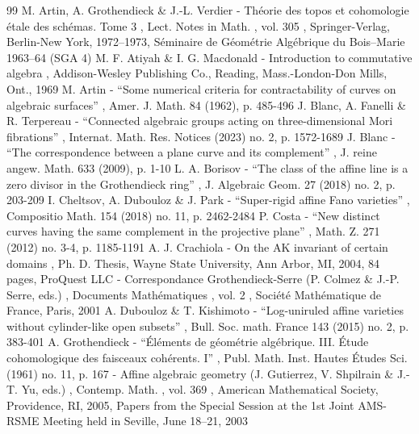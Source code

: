 \documentclass[11pt]{article}
\theoremstyle{definition}
\begin{document}

\begin{thebibliography}{99}
 M. Artin, A. Grothendieck \& J.-L. Verdier - Théorie des topos et cohomologie étale des schémas. Tome 3 , Lect. Notes in Math. , vol. 305 , Springer-Verlag, Berlin-New York, 1972–1973, Séminaire de Géométrie Algébrique du Bois–Marie 1963–64 (SGA 4)
 M. F. Atiyah \& I. G. Macdonald - Introduction to commutative algebra , Addison-Wesley Publishing Co., Reading, Mass.-London-Don Mills, Ont., 1969
 M. Artin - “Some numerical criteria for contractability of curves on algebraic surfaces” , Amer. J. Math. 84 (1962), p. 485-496
 J. Blanc, A. Fanelli \& R. Terpereau - “Connected algebraic groups acting on three-dimensional Mori fibrations” , Internat. Math. Res. Notices (2023) no. 2, p. 1572-1689
 J. Blanc - “The correspondence between a plane curve and its complement” , J. reine angew. Math. 633 (2009), p. 1-10
 L. A. Borisov - “The class of the affine line is a zero divisor in the Grothendieck ring” , J. Algebraic Geom. 27 (2018) no. 2, p. 203-209
 I. Cheltsov, A. Dubouloz \& J. Park - “Super-rigid affine Fano varieties” , Compositio Math. 154 (2018) no. 11, p. 2462-2484
 P. Costa - “New distinct curves having the same complement in the projective plane” , Math. Z. 271 (2012) no. 3-4, p. 1185-1191
 A. J. Crachiola - On the AK invariant of certain domains , Ph. D. Thesis, Wayne State University, Ann Arbor, MI, 2004, 84 pages, ProQuest LLC
 - Correspondance Grothendieck-Serre (P. Colmez \& J.-P. Serre, eds.) , Documents Mathématiques , vol. 2 , Société Mathématique de France, Paris, 2001
 A. Dubouloz \& T. Kishimoto - “Log-uniruled affine varieties without cylinder-like open subsets” , Bull. Soc. math. France 143 (2015) no. 2, p. 383-401
 A. Grothendieck - “Éléments de géométrie algébrique. III. Étude cohomologique des faisceaux cohérents. I” , Publ. Math. Inst. Hautes Études Sci. (1961) no. 11, p. 167
 - Affine algebraic geometry (J. Gutierrez, V. Shpilrain \& J.-T. Yu, eds.) , Contemp. Math. , vol. 369 , American Mathematical Society, Providence, RI, 2005, Papers from the Special Session at the 1st Joint AMS-RSME Meeting held in Seville, June 18–21, 2003

\end{thebibliography}
\end{document}
